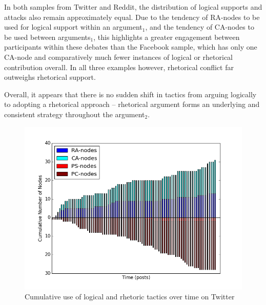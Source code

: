 In both samples from Twitter and Reddit, the distribution of logical supports and attacks also remain approximately equal. Due to the tendency of RA-nodes to be used for logical support within an argument$_1$, and the tendency of CA-nodes to be used between arguments$_1$, this highlights a greater engagement between participants within these debates than the Facebook sample, which has only one CA-node and comparatively much fewer instances of logical or rhetorical contribution overall. In all three examples however, rhetorical conflict far outweighs rhetorical support.

Overall, it appears that there is no sudden shift in tactics from arguing logically to adopting a rhetorical approach -- rhetorical argument forms an underlying and consistent strategy throughout the argument$_2$.

\begin{figure}
\centering
\includegraphics[scale=\scaleResults]{./figures/rhetoric_over_time/twitter.png}
\caption{Cumulative use of logical and rhetoric tactics over time on Twitter}
\label{figure:rhetorictime:Twitter}
\end{figure}

